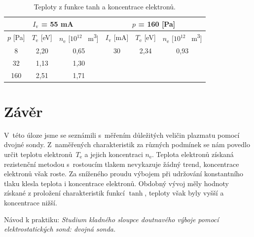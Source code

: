 \documentclass[a4paper,12pt]{article}
\begin{document}
\begin{center}
	\begin{table}[h!]
		\centering
		\caption{Teploty z funkce tanh a koncentrace elektronů.}
		\label{tab2}
		\begin{tabular}{|c|c|c|c|c|c|} \hline
			\multicolumn{3}{|c|}{$I_\text{v}$ = 55 \si{\milli\ampere}}& \multicolumn{3}{c|}{$p$ = 160 [\si{\pascal}] }  \\ \hline
			$p$ [\si{\pascal}] & $T_\text{e}$ [\si{\electronvolt}]  & $n_\text{e}$ [$10^{12}$ \si{\per\meter\cubed}]& $I_\text{v}$ [\si{\milli\ampere}] & $T_\text{e}$ [\si{\electronvolt}] & $n_\text{e}$  [$  10^{12}$ \si{\per\meter\cubed}]\\ \hline
			8 & 2,20 & 0,65 & 30 & 2,34 & 0,93\\ \hline
			32 & 1,13 & 1,30 &  &  &  \\ \hline
			160 & 2,51 &1,71 &  &  &  \\ \hline
			
		\end{tabular}
	\end{table}
\end{center}

\section{Závěr}
V~této úloze jsme se seznámili s~měřením důležitých veličin plazmatu pomocí dvojné sondy.
Z~naměřených charakteristik za různých podmínek se nám povedlo určit teplotu
elektronů~$T_\text{e}$ a jejich koncentraci $n_\text{e}$. Teplota elektronů získaná
rezistenční metodou s~rostoucím tlakem
nevykazuje žádný trend, koncentrace elektronů však roste. Za sníženého proudu výbojem
při udržování konstantního tlaku klesla teplota i koncentrace elektronů. Obdobný vývoj
měly hodnoty získané z proložení charakteristik funkcí $\tanh$, teploty však byly vyšší
a koncentrace nižší.


\begin{thebibliography}{10}
	 Návod k praktiku: \textit{Studium kladného sloupce doutnavého výboje pomocí elektrostatických sond: dvojná sonda.}
	
\end{thebibliography}
\end{document}
